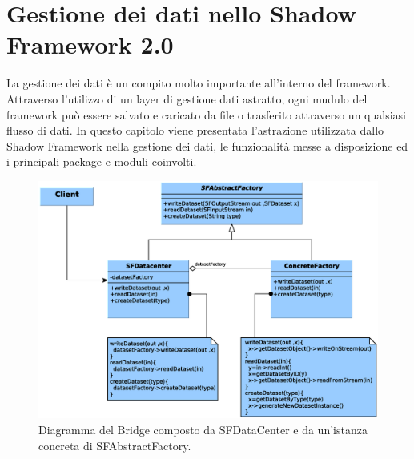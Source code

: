 
\chapter{Gestione dei dati nello Shadow Framework 2.0}
\label{ch:gestionedati}

La gestione dei dati \`e un compito molto importante all'interno del framework. Attraverso l'utilizzo di un layer di gestione dati astratto, ogni mudulo del framework pu\`o essere salvato e caricato da file o trasferito attraverso un qualsiasi flusso di dati.
In questo capitolo viene presentata l'astrazione utilizzata dallo Shadow Framework nella gestione dei dati, le funzionalit\`a messe a disposizione ed i principali package e moduli coinvolti.

\begin{figure}
\begin{center}
\includegraphics[width=\textwidth]{Immagini/DataCenterfactory}
\caption{Diagramma del Bridge composto da SFDataCenter e da un'istanza concreta di SFAbstractFactory.\label{f:datacenterfactory}} 
\end{center} 
\end{figure}

